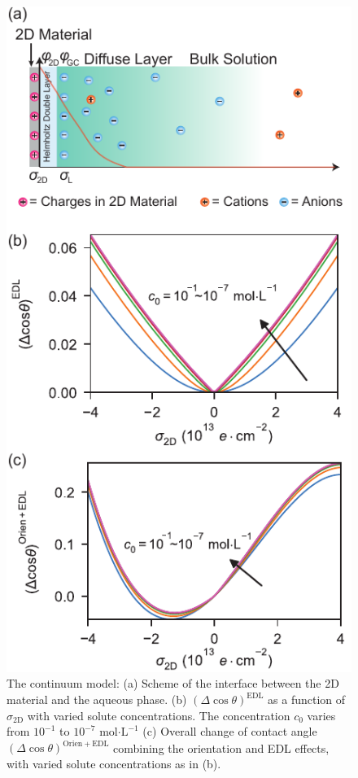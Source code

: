 \documentclass[journal=langd5,manuscript=article,email=true,hyperref=true,keywords=true]{achemso}
\begin{document}
\begin{figure}[htbp]
\centering
\includegraphics[width=0.5\linewidth]{../img/2d-ph-dependency+MD.pdf}
\caption{\label{fig:res-EDL} The continuum model: (a) Scheme of the
  interface between the 2D material and the aqueous phase. (b)
  \((\Delta\cos\theta)^{\mathrm{EDL}}\) as a function of
  \(\sigma_{\mathrm{2D}}\) with varied solute concentrations. The
  concentration \(c_{0}\) varies from \(10^{-1}\) to \(10^{-7}\)
  mol\(\cdot\mathrm{L}^{-1}\) (c) Overall change of contact angle
  \((\Delta \cos \theta)^{\mathrm{Orien+EDL}}\) combining the
  orientation and EDL effects, with varied solute concentrations as in
  (b).}
\end{figure}
\end{document}
